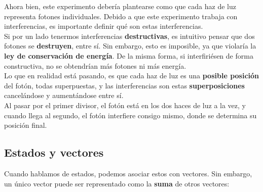 \documentclass{article}
\begin{document}
Ahora bien, este experimento debería plantearse como que cada haz de luz representa fotones individuales. Debido a que este experimento trabaja con interferencias,
es importante definir qué son estas interferencias.\\
Si por un lado tenermos interferencias \textbf{destructivas}, es intuitivo pensar que dos fotones se \textbf{destruyen}, entre sí. Sin embargo, esto es
imposible, ya que violaría la \textbf{ley de conservación de energía}. De la misma forma, si interfiriésen de forma constructiva, no se obtendrían más fotones
ni más energía.\\
Lo que en realidad está pasando, es que cada haz de luz es una \textbf{posible posición} del fotón, todas superpuestas, y las interferencias son
estas \textbf{superposiciones} cancelándose y aumentándose entre sí.\\
Al pasar por el primer divisor, el fotón está en los dos haces de luz a la vez, y cuando llega al segundo, el fotón interfiere consigo mismo, donde
se determina su posición final.

\subsection*{Estados y vectores}
Cuando hablamos de estados, podemos asociar estos con vectores. Sin embargo, un único vector puede ser representado como la \textbf{suma} de otros vectores:


\end{document}
